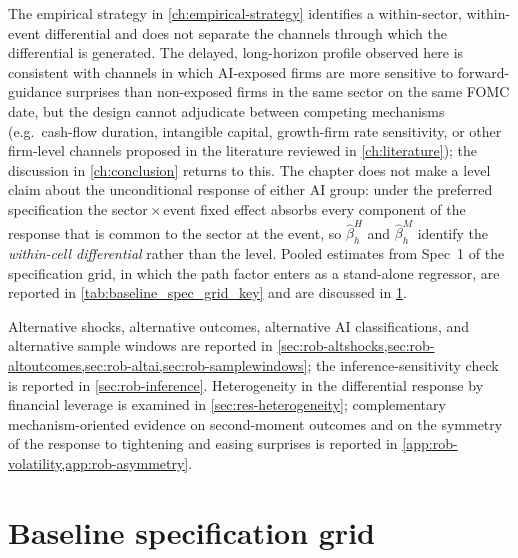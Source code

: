 The empirical strategy in \cref{ch:empirical-strategy} identifies a within-sector,
within-event differential and does not separate the channels through
which the differential is generated. The delayed, long-horizon profile
observed here is consistent with channels in which AI-exposed firms are
more sensitive to forward-guidance surprises than non-exposed firms in
the same sector on the same FOMC date, but the design cannot adjudicate
between competing mechanisms (e.g.\ cash-flow duration, intangible
capital, growth-firm rate sensitivity, or other firm-level channels
proposed in the literature reviewed in \cref{ch:literature}); the
discussion in \cref{ch:conclusion} returns to this. The chapter does not
make a level claim about the unconditional response of either AI group:
under the preferred specification the sector\,$\times$\,event fixed
effect absorbs every component of the response that is common to the
sector at the event, so $\hat\beta_h^H$ and $\hat\beta_h^M$ identify the
\emph{within-cell differential} rather than the level. Pooled estimates
from Spec~1 of the specification grid, in which the path factor enters as
a stand-alone regressor, are reported in \cref{tab:baseline_spec_grid_key}
and are discussed in \cref{sec:res-specgrid}.

Alternative shocks, alternative outcomes, alternative AI
classifications, and alternative sample windows are reported in
\cref{sec:rob-altshocks,sec:rob-altoutcomes,sec:rob-altai,sec:rob-samplewindows};
the inference-sensitivity check is reported in
\cref{sec:rob-inference}. Heterogeneity in the differential response
by financial leverage is examined in \cref{sec:res-heterogeneity};
complementary mechanism-oriented evidence on second-moment outcomes
and on the symmetry of the response to tightening and easing
surprises is reported in
\cref{app:rob-volatility,app:rob-asymmetry}.
 

\section{Baseline specification grid}
\label{sec:res-specgrid}


